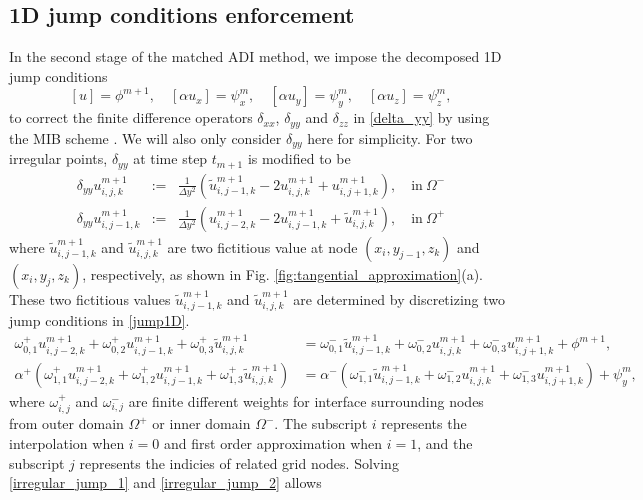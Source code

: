 \documentclass[dissertation]{uathesis}
\begin{document}
\begin{body}
\begin{flushleft}
\subsection{1D jump conditions enforcement}
\hspace{1cm} In the second stage of the matched ADI method, we impose the decomposed 1D jump conditions
\begin{equation}\label{jump1D}
[u]=\phi^{m+1}, \quad [\alpha u_x]=\psi_x^m, \quad [\alpha u_y]=\psi_y^m, \quad [\alpha u_z]=\psi_z^m, 
\end{equation}
to correct the finite difference operators $\delta_{xx}$, $\delta_{yy}$ and $\delta_{zz}$ in \eqref{delta_yy} by using the MIB scheme
\cite{zhao2004high,zhou2006high,yu2007three,yu2007matched}.
We will also only consider $\delta_{yy}$ here for simplicity. 
For two irregular points, $\delta_{yy}$ at time step $t_{m+1}$ is modified to be 
%
\begin{eqnarray} \label{MIB_delta_yy}
\delta_{yy} u^{m+1}_{i,j,k} &:=& \frac{1}{\Delta y^{2}} (\tilde{u}^{m+1}_{i,j-1,k} - 2 u^{m+1}_{i,j,k} + u^{m+1}_{i,j+1,k}), \quad \mbox{in}~ \Omega^- \nonumber \\
\delta_{yy} u^{m+1}_{i,j-1,k} &:=& \frac{1}{\Delta y^{2}} (u^{m+1}_{i,j-2,k} - 2 u^{m+1}_{i,j-1,k} + \tilde{u}^{m+1}_{i,j,k}), \quad \mbox{in}~ \Omega^+
\end{eqnarray}
%
where $\tilde{u}^{m+1}_{i,j-1,k}$ and $\tilde{u}^{m+1}_{i,j,k}$ are two fictitious value at node $(x_{i},y_{j-1},z_{k})$ and $(x_{i},y_{j},z_{k})$, respectively, as shown in Fig. \ref{fig:tangential_approximation}(a). These two fictitious values $\tilde{u}^{m+1}_{i,j-1,k}$ and $\tilde{u}^{m+1}_{i,j,k}$ are determined by discretizing two jump conditions in \eqref{jump1D}. 
%
\begin{align}
\omega^{+}_{0,1}u^{m+1}_{i,j-2,k}+\omega^{+}_{0,2}u^{m+1}_{i,j-1,k}+\omega^{+}_{0,3}\tilde{u}^{m+1}_{i,j,k}&=\omega^{-}_{0,1}\tilde{u}^{m+1}_{i,j-1,k}+\omega^{-}_{0,2}u^{m+1}_{i,j,k}+\omega^{-}_{0,3}u^{m+1}_{i,j+1,k}+\phi^{m+1}, \label{irregular_jump_1}\\
\alpha^{+}(\omega^{+}_{1,1}u^{m+1}_{i,j-2,k}+\omega^{+}_{1,2}u^{m+1}_{i,j-1,k}+\omega^{+}_{1,3}\tilde{u}^{m+1}_{i,j,k})&=\alpha^{-}(\omega^{-}_{1,1}\tilde{u}^{m+1}_{i,j-1,k}+\omega^{-}_{1,2}u^{m+1}_{i,j,k}+\omega^{-}_{1,3}u^{m+1}_{i,j+1,k})+\psi_{y}^{m}, \label{irregular_jump_2}
\end{align}
%
where $\omega^{+}_{i,j}$ and $\omega^{-}_{i,j}$ are finite different weights \cite{fornberg1998classroom} for interface surrounding nodes from outer domain $\Omega^{+}$ or inner domain $\Omega^{-}$. The subscript $i$ represents the interpolation when $i=0$ and first order approximation when $i=1$, and the subscript $j$ represents the indicies of related grid nodes. Solving \eqref{irregular_jump_1} and \eqref{irregular_jump_2} allows 

\end{flushleft}
\end{body}
\end{document}
